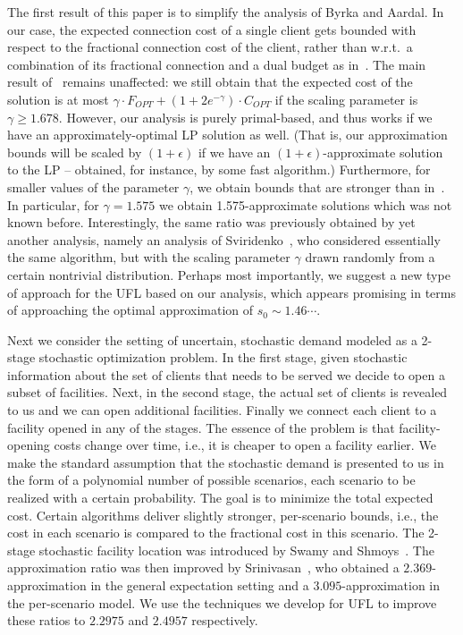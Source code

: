 \documentclass[11pt]{article}
\begin{document}
The first result of this paper is to simplify the analysis of Byrka and Aardal.
In our case, the expected connection cost of a single client 
gets bounded with respect to the fractional connection cost of the client,
rather than w.r.t.\ a combination of its fractional connection and a dual budget
as in~\cite{DBLP:journals/siamcomp/ChudakS03,byrka:2212}. The main result of~\cite{byrka:2212} 
remains unaffected: we still
obtain that the expected cost of the solution is at most $\gamma \cdot F_{OPT} + (1 + 2e^{-\gamma})\cdot C_{OPT}$ 
if the scaling parameter is $\gamma \geq 1.678$. However, our analysis is
purely primal-based, and thus works if we have an approximately-optimal
LP solution as well. (That is, our approximation bounds will be scaled by
$(1 + \epsilon)$ if we have an $(1 + \epsilon)$-approximate solution to the
LP -- obtained, for instance, by some fast algorithm.) 
Furthermore, for smaller values of the parameter $\gamma$, we obtain bounds that are stronger than in~\cite{byrka:2212}.
In particular, for $\gamma=1.575$ we obtain 1.575-approximate solutions which was not known
before. Interestingly, the same ratio was previously obtained by yet another analysis,
namely an analysis of Sviridenko~\cite{DBLP:conf/ipco/Sviridenko02}, who considered essentially the same algorithm, but
with the scaling parameter $\gamma$ drawn randomly from a certain nontrivial distribution. Perhaps most importantly, we suggest a new type of approach 
for the UFL based on our analysis, which appears promising in terms of
approaching the optimal approximation of $s_0 \sim 1.46\cdots$. 
 
Next we consider the setting of uncertain, stochastic demand modeled as a 2-stage stochastic
optimization problem. In the first stage, given stochastic information about the set of clients
that needs to be served we decide to open a subset of facilities. Next, in the second stage,
the actual set of clients is revealed to us and we can open additional facilities.
Finally we connect each client to a facility opened in any of the stages.
The essence of the problem is that facility-opening costs change over time,
i.e., it is cheaper to open a facility earlier. We make the standard assumption
that the stochastic demand is presented to us in the form of a polynomial number
of possible scenarios, each scenario to be realized with a certain probability.
The goal is to minimize the total expected cost. Certain algorithms deliver slightly stronger,
per-scenario bounds, i.e., the cost in each scenario is compared to the fractional cost in this scenario.
The 2-stage stochastic facility location was introduced by Swamy and Shmoys~\cite{DBLP:conf/focs/SwamyS05}.
The approximation ratio was then improved by Srinivasan~\cite{DBLP:conf/soda/Srinivasan07}, who obtained
a $2.369$-approximation in the general expectation setting and a $3.095$-approximation
in the per-scenario model. We use the techniques we develop for UFL
to improve these ratios to $2.2975$ 
and $2.4957$ respectively.
\end{document}
